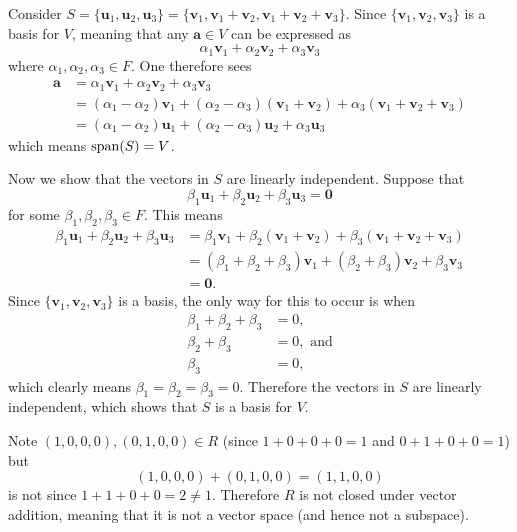 \begin{questions}
    \item Consider $S = \{\textbf{u}_1, \textbf{u}_2, \textbf{u}_3\} = \{\textbf{v}_1, \textbf{v}_1 + \textbf{v}_2, \textbf{v}_1 + \textbf{v}_2 + \textbf{v}_3\}$. Since $\{\textbf{v}_1,\textbf{v}_2,\textbf{v}_3\}$ is a basis for $V$, meaning that any $\textbf{a} \in V$ can be expressed as
    \[
        \alpha_1\textbf{v}_1 + \alpha_2\textbf{v}_2 + \alpha_3\textbf{v}_3
    \]
    where $\alpha_1, \alpha_2, \alpha_3 \in F$. One therefore sees
    \begin{align*}
        \textbf{a} &= \alpha_1\textbf{v}_1 + \alpha_2\textbf{v}_2 + \alpha_3\textbf{v}_3\\
        &= (\alpha_1 - \alpha_2)\textbf{v}_1 + (\alpha_2 - \alpha_3)(\textbf{v}_1 + \textbf{v}_2) + \alpha_3(\textbf{v}_1 + \textbf{v}_2 + \textbf{v}_3)\\
        &= (\alpha_1 - \alpha_2)\textbf{u}_1 + (\alpha_2 - \alpha_3)\textbf{u}_2 + \alpha_3\textbf{u}_3
    \end{align*}
    which means $\mathrm{span}(S) = V$.

    Now we show that the vectors in $S$ are linearly independent. Suppose that
    \[
        \beta_1\textbf{u}_1 + \beta_2\textbf{u}_2 + \beta_3\textbf{u}_3 = \textbf{0}
    \]
    for some $\beta_1, \beta_2, \beta_3 \in F$. This means
    \begin{align*}
        \beta_1\textbf{u}_1 + \beta_2\textbf{u}_2 + \beta_3\textbf{u}_3 &= \beta_1\textbf{v}_1 + \beta_2(\textbf{v}_1 + \textbf{v}_2) + \beta_3(\textbf{v}_1 + \textbf{v}_2 + \textbf{v}_3)\\
        &= (\beta_1+\beta_2+\beta_3)\textbf{v}_1 + (\beta_2+\beta_3)\textbf{v}_2 + \beta_3\textbf{v}_3\\
        &= \textbf{0}.
    \end{align*}
    Since $\{\textbf{v}_1, \textbf{v}_2, \textbf{v}_3\}$ is a basis, the only way for this to occur is when
    \begin{align*}
        \beta_1 + \beta_2 + \beta_3 &= 0,\\
        \beta_2 + \beta_3 &= 0, \text{ and}\\
        \beta_3 & = 0,
    \end{align*}
    which clearly means $\beta_1 = \beta_2 = \beta_3 = 0$. Therefore the vectors in $S$ are linearly independent, which shows that $S$ is a basis for $V$.

    \item \begin{partquestions}{\alph*}
        \item Note $(1, 0, 0, 0), (0, 1, 0, 0) \in R$ (since $1 + 0 + 0 + 0 = 1$ and $0 + 1 + 0 + 0 = 1$) but
        \[
            (1, 0, 0, 0) + (0, 1, 0, 0) = (1, 1, 0, 0)
        \]
        is not since $1 + 1 + 0 + 0 = 2 \neq 1$. Therefore $R$ is not closed under vector addition, meaning that it is not a vector space (and hence not a subspace).


\end{partquestions}
\end{questions}
